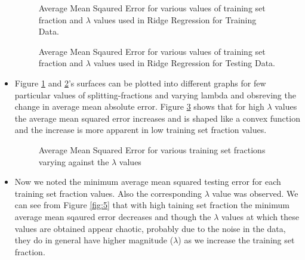 \documentclass{article}
\begin{document}
\begin{itemize}
\begin{figure}[!h]
 \caption{Average Mean Sqaured Error for various values of training set fraction and $\lambda$ values used in Ridge Regression for Training Data.}
 \label{fig:2}
 \end{figure}

 \begin{figure}[!h]
 \caption{Average Mean Sqaured Error for various values of training set fraction and $\lambda$ values used in Ridge Regression for Testing Data.}
 \label{fig:3}
 \end{figure}
 
\item Figure \ref{fig:2} and \ref{fig:3}'s surfaces can be plotted into different graphs for few particular values of splitting-fractions and varying lambda and obsreving the change in average mean absolute error. Figure \ref{fig:4} shows that for high $\lambda$ values the average mean squared error increases and is shaped like a convex function and the increase is more apparent in low training set fraction values.

\begin{figure}[!h]
 \caption{Average Mean Squared Error for various training set fractions varying against the $\lambda$ values}
 \label{fig:4}
 \end{figure}

\item Now we noted the minimum average mean squared testing error for each training set fraction values. Also the corresponding $\lambda$ value was observed. We can see from Figure \ref{fig:5} that with high taining set fraction the minimum average mean sqaured error decreases and though the $\lambda$ values at which these values are obtained appear chaotic, probably due to the noise in the data, they do in general have higher magnitude ($\lambda$) as we increase the training set fraction.


\end{itemize}
\end{document}
